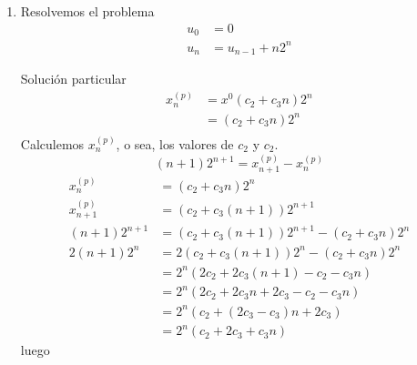 \begin{ejercicio}
\begin{enumerate}
        \item Resolvemos el problema
            \begin{align*}
                u_0 &= 0 \\
                u_n &= u_{n-1} + n2^n 
            \end{align*}
            Solución particular
            \begin{align*}
                x_n^{(p)} &= x^0 (c_2 + c_3 n) 2^n \\
                          &= (c_2 + c_3 n)2^n \\
            \end{align*}
            Calculemos $x_n^{(p)}$, o sea, los valores de $c_2$ y $c_2$.
            \begin{equation*}
                (n+1)2^{n+1} = x_{n+1}^{(p)} - x_{n}^{(p)}
            \end{equation*}
            \begin{align*}
                x_n^{(p)} &= (c_2+c_3n)2^n \\
                 x_{n+1}^{(p)} &= (c_2+c_3(n+1))2^{n+1} \\
                 (n+1)2^{n+1} &= (c_2 + c_3 (n+1))2^{n+1} - (c_2 + c_3n) 2^n \\
                 2(n+1)2^n &= 2(c_2+c_3(n+1))2^n - (c_2+c_3n)2^n \\
                           &= 2^n (2c_2+2c_3(n+1)-c_2-c_3n) \\
                           &= 2^n (2c_2 + 2c_3n + 2c_3 - c_2 -c_3 n) \\
                           &= 2^n (c_2 + (2c_3 - c_3)n + 2c_3) \\
                           &= 2^n (c_2 + 2c_3 + c_3n)
            \end{align*}
            luego
            \begin{equation*}

\end{equation*}
\end{enumerate}
\end{ejercicio}
